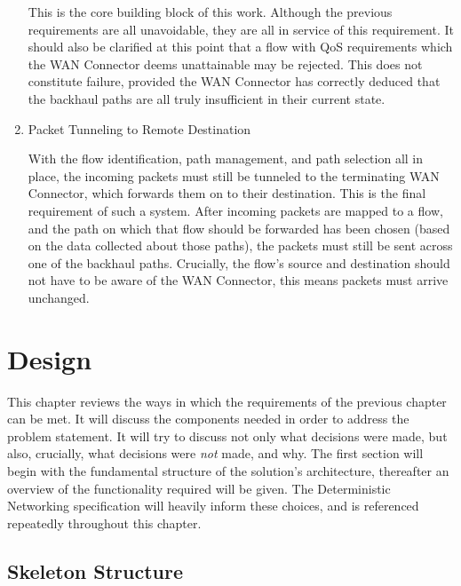 \begin{enumerate}
This is the core building block of this work. Although the previous requirements are all unavoidable, they are all in service of this requirement. It should also be clarified at this point that a flow with QoS requirements which the WAN Connector deems unattainable may be rejected. This does not constitute failure, provided the WAN Connector has correctly deduced that the backhaul paths are all truly insufficient in their current state.

\item Packet Tunneling to Remote Destination

With the flow identification, path management, and path selection all in place, the incoming packets must still be tunneled to the terminating WAN Connector, which forwards them on to their destination. This is the final requirement of such a system. After incoming packets are mapped to a flow, and the path on which that flow should be forwarded has been chosen (based on the data collected about those paths), the packets must still be sent across one of the backhaul paths. Crucially, the flow's source and destination should not have to be aware of the WAN Connector, this means packets must arrive unchanged.

\end{enumerate} 

\cleardoublepage
\chapter{Design}
\label{cha:design}

This chapter reviews the ways in which the requirements of the previous chapter can be met. It will discuss the components needed in order to address the problem statement. It will try to discuss not only what decisions were made, but also, crucially, what decisions were \textit{not} made, and why. The first section will begin with the fundamental structure of the solution's architecture, thereafter an overview of the functionality required will be given. The Deterministic Networking specification will heavily inform these choices, and is referenced repeatedly throughout this chapter.


\section{Skeleton Structure}
\label{sec:approach:plan}

